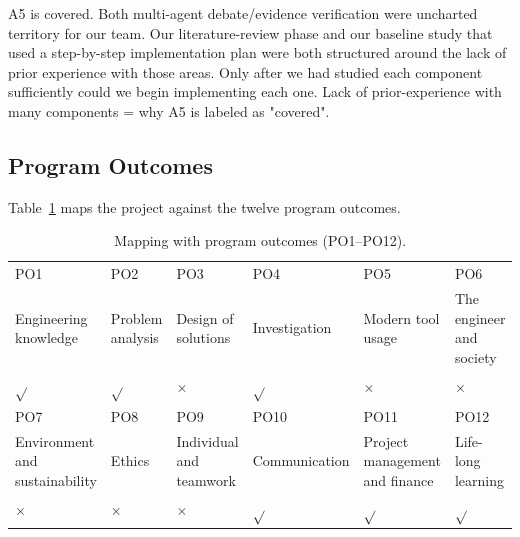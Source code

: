 A5 is covered. Both multi-agent debate/evidence verification were uncharted territory for our team. Our literature-review phase and our baseline study that used a step-by-step implementation plan were both structured around the lack of prior experience with those areas. Only after we had studied each component sufficiently could we begin implementing each one. Lack of prior-experience with many components = why A5 is labeled as "covered".

\subsection{Program Outcomes}

Table~\ref{tab:po_map} maps the project against the twelve program outcomes.

\begin{center}
    \begin{table}[ht]
        \centering
        \caption{Mapping with program outcomes (PO1--PO12).}
        \renewcommand{\arraystretch}{1.4}
        \scriptsize
        \setlength{\tabcolsep}{3pt}
        \begin{tabular}{|p{}|p{}|p{}|p{}|p{}|p{}|}
            \hline
            PO1                            & PO2              & PO3                             & PO4           & PO5                            & PO6                      \\
            Engineering knowledge          & Problem analysis & Design of solutions             & Investigation & Modern tool usage              & The engineer and society \\
            \hline
            $\sqrt{}$                      & $\sqrt{}$        & $\times$                        & $\sqrt{}$     & $\times$                       & $\times$                 \\
            \hline
            PO7                            & PO8              & PO9                             & PO10          & PO11                           & PO12                     \\
            Environment and sustainability & Ethics           & Individual and teamwork         & Communication & Project management and finance & Life-long learning       \\
            \hline
            $\times$                       & $\times$         & $\times$                        & $\sqrt{}$     & $\sqrt{}$                      & $\sqrt{}$                \\
            \hline
        \end{tabular}
        \label{tab:po_map}
    \end{table}
\end{center}

